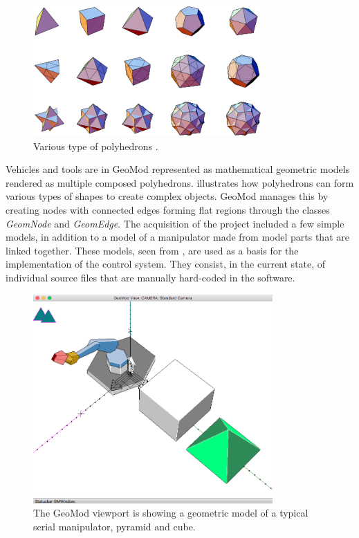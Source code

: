 \begin{figure}[ht]
    \centering
    \includegraphics[height=5cm]{images/poly.png}
    \caption[Various type of polyhedrons \cite{polyhedrons}]{Various type of polyhedrons \cite{polyhedrons}.}
    \label{fig:polyhedrons}
\end{figure}

\noindent Vehicles and tools are in GeoMod represented as mathematical geometric models rendered as multiple composed polyhedrons.  illustrates how polyhedrons can form various types of shapes to create complex objects. GeoMod manages this by creating nodes with connected edges forming flat regions through the classes \textit{GeomNode} and \textit{GeomEdge}. The acquisition of the project included a few simple models, in addition to a model of a manipulator made from model parts that are linked together. These models, seen from , are used as a basis for the implementation of the control system. They consist, in the current state, of individual source files that are manually hard-coded in the software. 

\begin{figure}[ht]
    \centering
    \includegraphics[height=8cm]{images/Models.png}
    \caption[The GeoMod viewport is showing a geometric model of a typical serial manipulator, pyramid and cube]{The GeoMod viewport is showing a geometric model of a typical serial manipulator, pyramid and cube.}
    \label{fig:viewport}
\end{figure}

